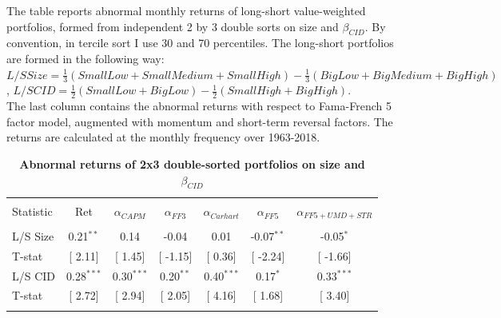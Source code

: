 \documentclass[12pt]{article}
\begin{document}
\vspace{1cm}



\begin{table}[!htbp] \centering 
  \caption{\textbf{Abnormal returns of 2x3 double-sorted portfolios on size and $\beta_{CID}$}}
  \label{} 
  \begin{flushleft}
    {\medskip\small
 The table reports abnormal monthly returns of long-short value-weighted portfolios, formed from independent 2 by 3 double sorts on size and $\beta_{CID}$. By convention, in tercile sort I use 30 and 70 percentiles. The long-short portfolios are formed in the following way:
 $L/S Size = \frac{1}{3}(SmallLow+SmallMedium+SmallHigh) - \frac{1}{3}(BigLow+BigMedium+BigHigh)$,
 $L/S CID = \frac{1}{2}(SmallLow+BigLow) - \frac{1}{2}(SmallHigh+BigHigh)$. \\
 The last column contains the abnormal returns with respect to Fama-French 5 factor model, augmented with momentum and short-term reversal factors. The returns are calculated at the monthly frequency over 1963-2018.}
    \medskip
    \end{flushleft}
\begin{tabular}{@{\extracolsep{5pt}} lcccccc} 
\\[-1.8ex]\hline 
\hline \\[-1.8ex] 
Statistic & Ret & $\alpha_{CAPM}$ & $\alpha_{FF3}$ & $\alpha_{Carhart}$ & $\alpha_{FF5}$ & $\alpha_{FF5+UMD+STR}$ \\ 
\hline \\[-1.8ex] 
L/S Size & 0.21$^{**}$ & 0.14 & -0.04 & 0.01 & -0.07$^{**}$ & -0.05$^{*}$ \\ 
T-stat & [ 2.11] & [ 1.45] & [ -1.15] & [ 0.36] & [ -2.24] & [ -1.66] \\ 
L/S CID & 0.28$^{***}$ & 0.30$^{***}$ & 0.20$^{**}$ & 0.40$^{***}$ & 0.17$^{*}$ & 0.33$^{***}$ \\ 
T-stat & [ 2.72] & [ 2.94] & [ 2.05] & [ 4.16] & [ 1.68] & [ 3.40] \\ 
\hline \\[-1.8ex] 
\end{tabular}
\end{table}
\end{document}
